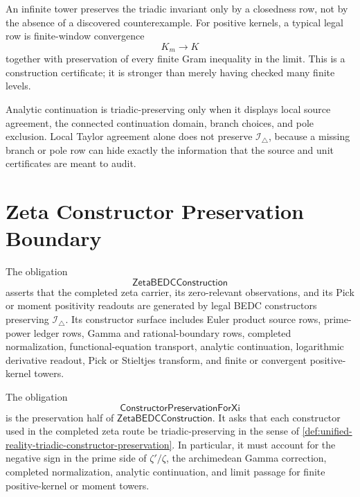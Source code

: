 \begin{principle}
\label{prin:unified-reality-triadic-limit-preservation}
An infinite tower preserves the triadic invariant only by a closedness
row, not by the absence of a discovered counterexample. For positive
kernels, a typical legal row is finite-window convergence
$$
K_m\to K
$$
together with preservation of every finite Gram inequality in the
limit. This is a construction certificate; it is stronger than merely
having checked many finite levels.
\end{principle}

\begin{principle}
\label{prin:unified-reality-triadic-analytic-continuation-preservation}
Analytic continuation is triadic-preserving only when it displays local
source agreement, the connected continuation domain, branch choices, and
pole exclusion. Local Taylor agreement alone does not preserve
$\mathcal I_{\triangle}$, because a missing branch or pole row can hide
exactly the information that the source and unit certificates are meant
to audit.
\end{principle}

\section{Zeta Constructor Preservation Boundary}
\label{sec:unified-reality-zeta-constructor-preservation-boundary}

\begin{definition}[ZetaBEDCConstruction]
\label{def:unified-reality-zeta-bedc-construction}
The obligation
$$
\mathsf{ZetaBEDCConstruction}
$$
asserts that the completed zeta carrier, its zero-relevant observations,
and its Pick or moment positivity readouts are generated by legal BEDC
constructors preserving $\mathcal I_{\triangle}$. Its constructor
surface includes Euler product source rows, prime-power ledger rows,
Gamma and rational-boundary rows, completed normalization,
functional-equation transport, analytic continuation, logarithmic
derivative readout, Pick or Stieltjes transform, and finite or convergent
positive-kernel towers.
\end{definition}

\begin{definition}[ConstructorPreservationForXi]
\label{def:unified-reality-constructor-preservation-for-xi}
The obligation
$$
\mathsf{ConstructorPreservationForXi}
$$
is the preservation half of
$\mathsf{ZetaBEDCConstruction}$. It asks that each constructor used in
the completed zeta route be triadic-preserving in the sense of
\autoref{def:unified-reality-triadic-constructor-preservation}. In
particular, it must account for the negative sign in the prime side of
$\zeta'/\zeta$, the archimedean Gamma correction, completed
normalization, analytic continuation, and limit passage for finite
positive-kernel or moment towers.
\end{definition}

